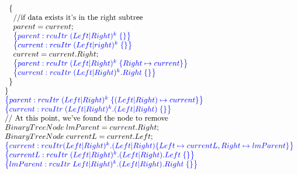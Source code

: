 \[\begin{array}{@{}l@{}}
        \;\;\;\;\{\\
            \;\;\;\;\;\;\text{//if data exists it's in the right subtree}\\
            \;\;\;\;\;\;parent = current; \\
            \;\;\;\;\;\;\specline{parent:rcuItr\; (Left|Right)^{k} \; \{ \} }\\
            \;\;\;\;\;\;\specline{current:rcuItr\; (Left|right)^{k} \; \{ \} }\\
            \;\;\;\;\;\;current = current.Right; \\
            \;\;\;\;\;\;\specline{parent:rcuItr\; (Left|Right)^{k} \; \{ Right\mapsto current\} }\\
            \;\;\;\;\;\;\specline{current:rcuItr\; (Left|Right)^{k}.Right \; \{ \} }\\
        \;\;\;\;\}\\
    \;\;\} \\
    \;\;\specline{parent:rcuItr\; (Left|Right)^{k} \; \{(Left|Right)\mapsto current\} }\\
    \;\;\specline{current:rcuItr\; (Left|Right)^{k}.(Left|Right) \; \{ \} }\\
    \;\;\text{// At this point, we've found the node to remove}\\
    \;\;BinaryTreeNode \;lmParent = current.Right;\\
    \;\;BinaryTreeNode \;currentL = current.Left;\\
    \;\;\specline{current:rcuItr (Left|Right)^{k}.(Left|Right) \{ Left \mapsto currentL, Right \mapsto lmParent\} }\\
    \;\;\specline{currentL:rcuItr\; (Left|Right)^{k}.(Left|Right).Left \; \{\} }\\
     \;\;\specline{lmParent:rcuItr\; Left|Right)^{k}.(Left|Right).Right \; \{ \} }\\
    
\end{array}
\]
